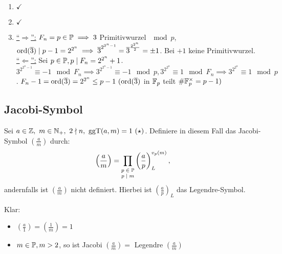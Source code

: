 \documentclass[a4paper,twoside,DIV15,BCOR12mm]{scrbook}
\begin{document}
\begin{beweis}
    \begin{enumerate}
        \item $\checkmark$
        \item $\checkmark$
        \item \underline{"`$\Longrightarrow$"':} $F_n = p \in \mathbb{P} \implies 3$ Primitivwurzel
        $\mod p$, $\mathop{\rm ord}\nolimits(\overline 3) \mid p-1 = 2^{2^n} \implies \overline 3^{2^{2^n-1}}
        = \overline 3^{\frac{2^{2^n}}{2}} = \pm 1$. Bei $+1$ keine Primitivwurzel.\\
        \underline{"`$\Longleftarrow$"':} Sei $p \in \mathbb{P}, p \mid F_n = 2^{2^n} + 1$.
        $3^{2^{2^n-1}} \equiv -1 \mod F_n \implies 3^{2^{2^n-1}} \equiv -1 \mod p,
         3^{2^{2^n}} \equiv 1 \mod F_n \implies 3^{2^{2^n}} \equiv 1 \mod p$.
         $F_n -1 = \ord(\overline 3) = 2^{2^n} \le p-1\ (\ord(\overline 3) $ in $\mathbb{F}_p$
         teilt ${\#\mathbb{F}_p^\times = p-1)}$
    \end{enumerate}
\end{beweis}

\subsection{Jacobi-Symbol}
\begin{definition}
    Sei $a \in \mathbb{Z},\ m \in \mathbb{N}_+,\ 2 \nmid n,\ \mathop{\rm ggT}\nolimits(a,m) = 1\ (\star)$. Definiere in diesem
    Fall das Jacobi-Symbol $\left(\frac{a}{m}\right)$ durch:
    \[
        \left(\frac{a}{m}\right) = \prod_{\scriptsize\begin{matrix}p\in \mathbb{P}\\p
        \mid m\end{matrix}} \left(\frac{a}{p}\right)_L^{v_p(m)},
    \]
    andernfalls ist $\left(\frac{a}{m}\right)$ nicht definiert.
    Hierbei ist $\left(\frac a p\right)_L$ das Legendre-Symbol.

    Klar:
    \begin{itemize}
        \item[] $\left(\frac{a}{1}\right) = \left(\frac{1}{m}\right) = 1$
        \item[] $m \in \mathbb{P}, m > 2$, so ist Jacobi $\left(\frac{a}{m}\right) = $ Legendre $\left(\frac{a}{m}\right)$
    \end{itemize}
\end{definition}
\end{document}
